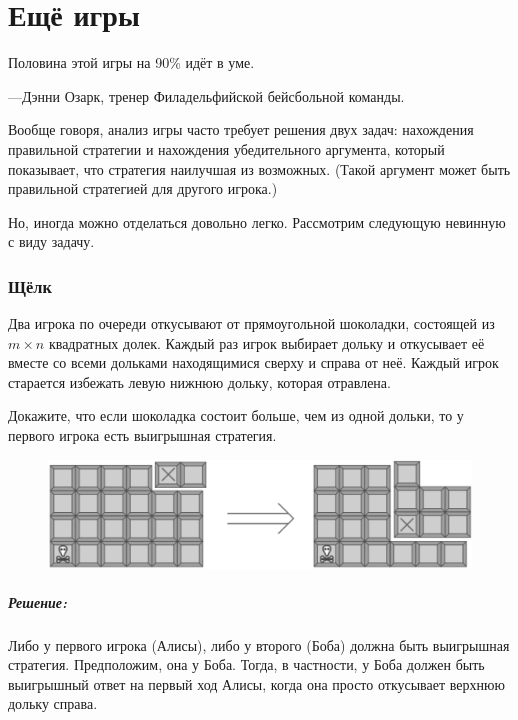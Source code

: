 \chapter*{Ещё игры}

\setlength{\epigraphwidth}{.6\textwidth}
\epigraph{Половина этой игры на 90\% идёт в уме.}{---Дэнни Озарк, тренер Филадельфийской бейсбольной команды.}

Вообще говоря, анализ игры часто требует решения двух задач: нахождения правильной стратегии и нахождения убедительного аргумента, который показывает, что стратегия наилучшая из возможных.
(Такой аргумент может быть правильной стратегией для другого игрока.)

Но, иногда можно отделаться довольно легко.
Рассмотрим следующую невинную с виду задачу.

\subsection*{Щёлк}%

Два игрока по очереди откусывают от прямоугольной шоколадки, состоящей из $m \times n$ квадратных долек.
Каждый раз игрок выбирает дольку и откусывает её вместе со всеми дольками находящимися сверху и справа от неё.
Каждый игрок старается избежать левую нижнюю дольку, которая отравлена.

Докажите, что если шоколадка состоит больше, чем из одной дольки, то у первого игрока есть выигрышная стратегия.

\begin{figure}[h!]
\centering
\includegraphics[scale=0.5]{Figs/MoreGames/chomp}
\end{figure}

\paragraph{Решение:} Либо у первого игрока (Алисы), либо у второго (Боба) должна быть выигрышная стратегия.
Предположим, она у Боба.
Тогда, в частности, у Боба должен быть выигрышный ответ на первый ход Алисы, когда она просто откусывает верхнюю дольку справа.

